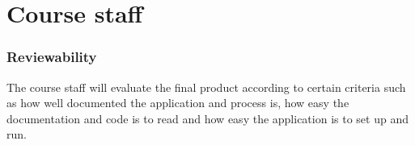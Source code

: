     \section{Course staff}
        \subsubsection*{Reviewability}
        The course staff will evaluate the final product according to certain criteria such as how well documented the application and process is, how easy the documentation and code is to read and how easy the application is to set up and run.
